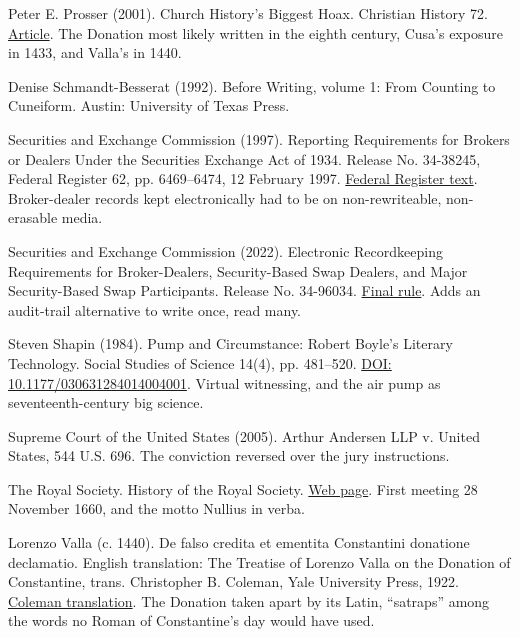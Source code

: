 \noindent Peter E. Prosser (2001). Church History's Biggest Hoax. Christian History 72. \href{https://christianhistoryinstitute.org/magazine/article/church-historys-biggest-hoax}{Article}. The Donation most likely written in the eighth century, Cusa's exposure in 1433, and Valla's in 1440.
\par\medskip

\noindent Denise Schmandt-Besserat (1992). Before Writing, volume 1: From Counting to Cuneiform. Austin: University of Texas Press.
\par\medskip

\noindent Securities and Exchange Commission (1997). Reporting Requirements for Brokers or Dealers Under the Securities Exchange Act of 1934. Release No. 34-38245, Federal Register 62, pp. 6469--6474, 12 February 1997. \href{https://www.govinfo.gov/content/pkg/FR-1997-02-12/html/97-3426.htm}{Federal Register text}. Broker-dealer records kept electronically had to be on non-rewriteable, non-erasable media.
\par\medskip

\noindent Securities and Exchange Commission (2022). Electronic Recordkeeping Requirements for Broker-Dealers, Security-Based Swap Dealers, and Major Security-Based Swap Participants. Release No. 34-96034. \href{https://www.sec.gov/rules/final/2022/34-96034.pdf}{Final rule}. Adds an audit-trail alternative to write once, read many.
\par\medskip

\noindent Steven Shapin (1984). Pump and Circumstance: Robert Boyle's Literary Technology. Social Studies of Science 14(4), pp. 481--520. \href{https://doi.org/10.1177/030631284014004001}{DOI: 10.1177/030631284014004001}. Virtual witnessing, and the air pump as seventeenth-century big science.
\par\medskip

\noindent Supreme Court of the United States (2005). Arthur Andersen LLP v. United States, 544 U.S. 696. The conviction reversed over the jury instructions.
\par\medskip

\noindent The Royal Society. History of the Royal Society. \href{https://royalsociety.org/about-us/who-we-are/history/}{Web page}. First meeting 28 November 1660, and the motto Nullius in verba.
\par\medskip

\noindent Lorenzo Valla (c. 1440). De falso credita et ementita Constantini donatione declamatio. English translation: The Treatise of Lorenzo Valla on the Donation of Constantine, trans. Christopher B. Coleman, Yale University Press, 1922. \href{https://history.hanover.edu/texts/vallaintro.html}{Coleman translation}. The Donation taken apart by its Latin, ``satraps'' among the words no Roman of Constantine's day would have used.
\par\medskip

